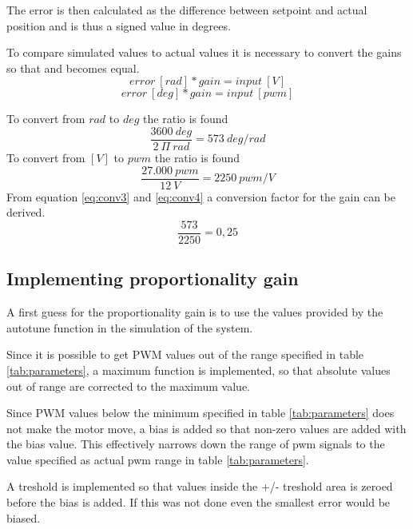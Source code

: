 The error is then calculated as the difference between setpoint and actual position and is thus a signed value in degrees.

To compare simulated values to actual values it is necessary to convert the gains so that \label{eq:conv1} and \label{eq:conv2} becomes equal. 
\begin{equation}
error \ [rad] * gain = input \ [V]
\label{eq:conv1}
\end{equation}
\begin{equation}
error \ [deg] * gain = input \ [pwm]
\label{eq:conv2}
\end{equation}

To convert from $rad$ to $deg$ the ratio is found
\begin{equation}
\frac{3600 \ deg}{2 \ \Pi \ rad} = 573 \ deg/rad
\label{eq:conv3}
\end{equation}
To convert from $[V]$ to $pwm$ the ratio is found
\begin{equation}
\frac{27.000 \ pwm}{12 \ V} = 2250 \ pwm/V
\label{eq:conv4}
\end{equation}
From equation \ref{eq:conv3} and \ref{eq:conv4} a conversion factor for the gain can be derived.
\begin{equation}
\frac{573}{2250} = 0,25
\label{eq:conv}
\end{equation}

\subsection{Implementing proportionality gain}
A first guess for the proportionality gain is to use the values provided by the autotune function in the simulation of the system. 

Since it is possible to get PWM values out of the range specified in table \ref{tab:parameters}, a maximum function is implemented, so that absolute values out of range are corrected to the maximum value.

Since PWM values below the minimum specified in table \ref{tab:parameters} does not make the motor move, a bias is added so that non-zero values are added with the bias value. This effectively narrows down the range of pwm signals to the value specified as actual pwm range in table \ref{tab:parameters}. 

A treshold is implemented so that values inside the +/- treshold area is zeroed before the bias is added. If this was not done even the smallest error would be biased.

